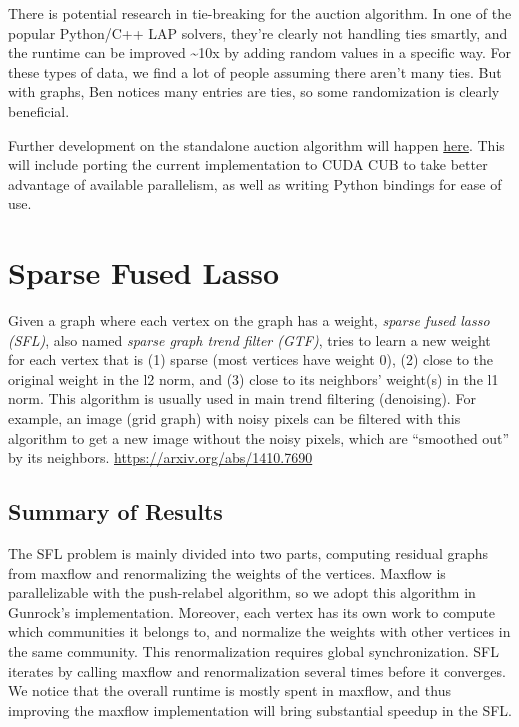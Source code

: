 \documentclass[10pt,oneside]{memoir}
\begin{document}
There is potential research in tie-breaking for the auction algorithm.
In one of the popular Python/C++ LAP solvers, they're clearly not
handling ties smartly, and the runtime can be improved
\textasciitilde{}10x by adding random values in a specific way. For
these types of data, we find a lot of people assuming there aren't many
ties. But with graphs, Ben notices many entries are ties, so some
randomization is clearly beneficial.

Further development on the standalone auction algorithm will happen
\href{https://github.com/bkj/cbert}{here}. This will include porting the
current implementation to CUDA CUB to take better advantage of available
parallelism, as well as writing Python bindings for ease of use.

\hypertarget{sparse-fused-lasso-1}{%
\chapter{Sparse Fused Lasso}\label{sparse-fused-lasso-1}}

Given a graph where each vertex on the graph has a weight, \emph{sparse
fused lasso (SFL)}, also named \emph{sparse graph trend filter (GTF)},
tries to learn a new weight for each vertex that is (1) sparse (most
vertices have weight 0), (2) close to the original weight in the l2
norm, and (3) close to its neighbors' weight(s) in the l1 norm. This
algorithm is usually used in main trend filtering (denoising). For
example, an image (grid graph) with noisy pixels can be filtered with
this algorithm to get a new image without the noisy pixels, which are
``smoothed out'' by its neighbors. \url{https://arxiv.org/abs/1410.7690}

\hypertarget{summary-of-results-8}{%
\section{Summary of Results}\label{summary-of-results-8}}

The SFL problem is mainly divided into two parts, computing residual
graphs from maxflow and renormalizing the weights of the vertices.
Maxflow is parallelizable with the push-relabel algorithm, so we adopt
this algorithm in Gunrock's implementation. Moreover, each vertex has
its own work to compute which communities it belongs to, and normalize
the weights with other vertices in the same community. This
renormalization requires global synchronization. SFL iterates by calling
maxflow and renormalization several times before it converges. We notice
that the overall runtime is mostly spent in maxflow, and thus improving
the maxflow implementation will bring substantial speedup in the SFL.
\end{document}

